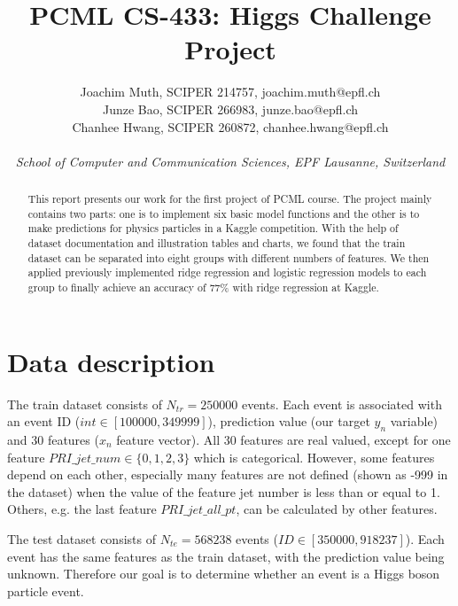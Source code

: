 \documentclass[10pt,conference,compsocconf]{IEEEtran}
\begin{document}
\title{PCML CS-433: Higgs Challenge Project}

\author{
  Joachim Muth, SCIPER 214757, joachim.muth@epfl.ch\\
  Junze Bao, SCIPER 266983, junze.bao@epfl.ch\\
  Chanhee Hwang, SCIPER 260872, chanhee.hwang@epfl.ch\\ \\
  \textit{School of Computer and Communication Sciences, EPF Lausanne, Switzerland}
}

\maketitle

\begin{abstract}
This report presents our work for the first project of PCML course. The project mainly contains two parts: one is to implement six basic model functions and the other is to make predictions for physics particles in a Kaggle competition. With the help of dataset documentation and illustration tables and charts, we found that the train dataset can be separated into eight groups with different numbers of features. We then applied previously implemented ridge regression and logistic regression models to each group to finally achieve an accuracy of 77\% with ridge regression at Kaggle.
\end{abstract}

\section{Data description}
The train dataset consists of $N_{tr} = 250000$ events. Each event is associated with an event ID ($int \in [100000, 349999]$), prediction value (our target \textbf{$y_n$} variable) and 30 features (\textbf{$x_n$} feature vector). All 30 features are real valued, except for one feature $PRI\_jet\_num \in \{0, 1, 2, 3\}$ which is categorical. However, some features depend on each other, especially many features are not defined (shown as -999 in the dataset) when the value of the feature jet number is less than or equal to 1. Others, e.g. the last feature $PRI\_jet\_all\_pt$, can be calculated by other features.

The test dataset consists of $N_{te} = 568238$ events ($ID \in [350000, 918237]$). Each event has the same features as the train dataset, with the prediction value being unknown. Therefore our goal is to determine whether an event is a Higgs boson particle event.
\end{document}
